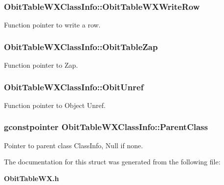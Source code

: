 \subsubsection{ {\bf Obit\-Table\-WXClass\-Info::Obit\-Table\-WXWrite\-Row}}\label{structObitTableWXClassInfo_o33}


Function pointer to write a row. 

\subsubsection{ {\bf Obit\-Table\-WXClass\-Info::Obit\-Table\-Zap}}\label{structObitTableWXClassInfo_o19}


Function pointer to Zap. 

\subsubsection{ {\bf Obit\-Table\-WXClass\-Info::Obit\-Unref}}\label{structObitTableWXClassInfo_o11}


Function pointer to Object Unref. 

\subsubsection{\setlength{\rightskip}{0pt plus 5cm}gconstpointer {\bf Obit\-Table\-WXClass\-Info::Parent\-Class}}\label{structObitTableWXClassInfo_o3}


Pointer to parent class Class\-Info, Null if none. 



The documentation for this struct was generated from the following file:\begin{CompactItemize}
\item 
{\bf Obit\-Table\-WX.h}\end{CompactItemize}
